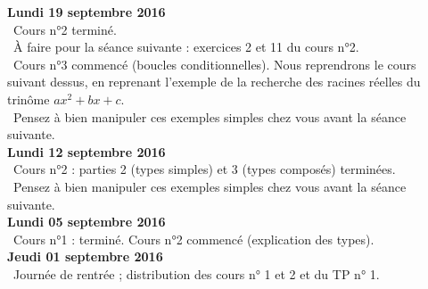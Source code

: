 \documentclass[12pt,a4paper]{article}
\begin{document}
\noindent\textbf{Lundi 19 septembre 2016 }\\
\bu\ Cours n°2 terminé. \\
\bu\ À faire pour la séance suivante : exercices 2 et 11 du cours n°2. \\
\bu\ Cours n°3 commencé (boucles conditionnelles). Nous reprendrons le cours suivant dessus, en reprenant l'exemple de la recherche des racines réelles du trinôme $ax^2+bx+c$. \\
\bu\ Pensez à bien manipuler ces exemples simples chez vous avant la séance suivante. \vspace{.4cm}\\

\noindent\textbf{Lundi 12 septembre 2016 }\\
\bu\ Cours n°2 : parties 2 (types simples) et 3 (types composés) terminées. \\
\bu\ Pensez à bien manipuler ces exemples simples chez vous avant la séance suivante. \vspace{.4cm}\\

\noindent\textbf{Lundi 05 septembre 2016 }\\
\bu\ Cours n°1 : terminé. Cours n°2 commencé (explication des types). \vspace{.4cm}\\

\noindent\textbf{Jeudi 01 septembre 2016 }\\
\bu\ Journée de rentrée ; distribution des cours n° 1 et 2 et du TP n° 1. 

\label{end}
\end{document}
